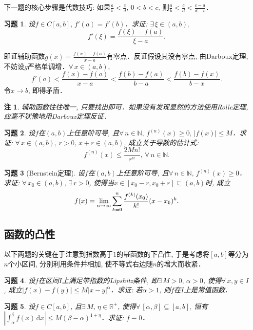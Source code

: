 \documentclass[11pt,a4paper]{ctexart}
\makeatletter
\theoremstyle{thmseries} %
\theoremstyle{exerseries}
\newtheorem{exer}{习题}[section]
\newtheorem*{rem}{注}
\renewenvironment{proof}[1][\proofname]{\par
  \pushQED{\qed}%
  \normalfont \topsep6\p@\@plus6\p@\relax
  \trivlist
  \item[\hskip\labelsep
        \itshape
    #1\@addpunct{}]\ignorespaces
}{%
  \popQED\endtrivlist\@endpefalse
}
\newenvironment{pf}{\begin{proof}[\bfseries\upshape 证\quad]}{\end{proof}}
\newcommand{\R}{\mathbb{R}}
\newcommand{\N}{\mathbb{N}}
\renewcommand{\d}{\mathrm{d}}
\def \nti {\mathnormal{n}\to\infty}
\makeatother
\begin{document}
下一题的核心步骤是代数技巧: 如果$\frac{a}{b}<\frac{c}{d},\,0<b<c$, 则$\frac{a}{b}<\frac{c}{d}<\frac{c-a}{d-b}$．
\begin{exer}
	设$f\in C[a,b],\,f'(a)=f'(b)$．求证: $\exists\,\xi\in(a,b),$
	\[f'(\xi)=\frac{f(\xi)-f(a)}{\xi-a}.\]
\end{exer}
\begin{pf}
	即证辅助函数$g(x)=\frac{f(x)-f(a)}{x-a}$有零点．反证假设其没有零点, 由Darboux定理, 不妨设$g$严格单调增．$\forall\,x\in(a,b),$
	\[f'(a)<\frac{f(x)-f(a)}{x-a}<\frac{f(b)-f(a)}{b-a}<\frac{f(b)-f(x)}{b-x}.\]
	令$x\to b$, 即得矛盾．
\end{pf}
\begin{rem}
	辅助函数往往唯一, 只要找出即可．如果没有发现显然的方法使用Rolle定理, 应毫不犹豫地用Darboux定理反证．
\end{rem}

\begin{exer}
	设$f$在$(a,b)$上任意阶可导, 且$\forall\,n\in\N,\,f^{(n)}(x)\geq0,\,|f(x)|\leq M$．求证: $\forall\,x\in(a,b),\,r>0,\,x+r\in(a,b)$, 成立关于导数的估计式: 
	\[f^{(n)}(x)\leq\frac{2Mn!}{r^n},\,\forall\,n\in\N.\]
\end{exer}

\begin{exer}[Bernstein定理]
	设$f$在$(a,b)$上任意阶可导, 且$\forall\,n\in\N,\,f^{(n)}(x)\geq0$．求证: $\forall\,x_0\in(a,b),\,\exists\,r>0$, 使得当$x\in[x_0-r,x_0+r]\subseteq(a,b)$时, 成立
	\[f(x)=\lim_{\nti}\sum_{k=0}^{n}\frac{f^{(k)}(x_0)}{k!}(x-x_0)^k.\]
\end{exer}


\subsection{函数的凸性}
以下两题的关键在于注意到指数高于$1$的幂函数的下凸性, 于是考虑将$[a,b]$等分为$n$个小区间, 分别利用条件并相加, 使不等式右边随$n$的增大而收紧．
\begin{exer}
	设$f$在区间$I$上满足带指数的Lipshitz条件, 即$\exists\,M>0,\,\alpha>0$, 使得$\forall\,x,y\in I$, 成立$|f(x)-f(y)|\leq M|x-y|^\alpha$．求证: 若$\alpha>1$, 则$f$在$I$上是常值函数．
\end{exer}

\begin{exer}
	设$f\in C[a,b]$, 且$\exists\,M,\,\eta\in\R^+$, 使得$\forall\,[\alpha,\beta]\subseteq[a,b]$, 恒有$\left|\int_{\alpha}^{\beta}f(x)\,\d x\right|\leq M(\beta-\alpha)^{1+\eta}$．求证: $f\equiv0$．
\end{exer}
\end{document}
